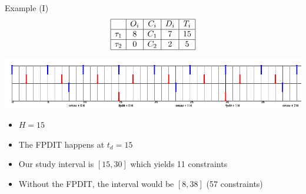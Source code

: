 \documentclass{beamer}
\begin{document}
    \begin{frame}{Example (I)}
        \[
        \begin{array}{|r|c|c|c|c|}
         \hline
          & O_i & C_i & D_i & T_i \\
         \hline
         \tau_1 & 8 & C_1 & 7 & 15\\
         \hline
         \tau_2 & 0 & C_2 & 2 & 5\\
         \hline
        \end{array}
        \]

        \includegraphics[width=\textwidth]{figs/CspaceExampleArrDead.png}

        \begin{itemize}
            \item $H = 15$
            \item The FPDIT happens at $t_d = 15$
            \item Our study interval is $[15, 30]$ which yields 11 constraints
            \item Without the FPDIT, the interval would be $[8, 38]$ (57 constraints)
        \end{itemize}
    \end{frame}
\end{document}
